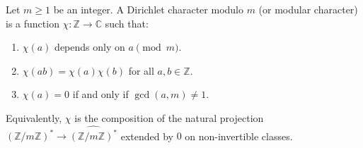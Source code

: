 Let $m \geq 1$ be an integer. A Dirichlet character modulo $m$ (or modular character) is a function $\chi: \mathbb{Z} \to \mathbb{C}$ such that:
\begin{enumerate}
\item $\chi(a)$ depends only on $a \pmod{m}$.
\item $\chi(ab) = \chi(a)\chi(b)$ for all $a, b \in \mathbb{Z}$.
\item $\chi(a) = 0$ if and only if $\gcd(a, m) \neq 1$.
\end{enumerate}
Equivalently, $\chi$ is the composition of the natural projection $(\mathbb{Z}/m\mathbb{Z})^* \to \widehat{(\mathbb{Z}/m\mathbb{Z})^*}$ extended by $0$ on non-invertible classes.
